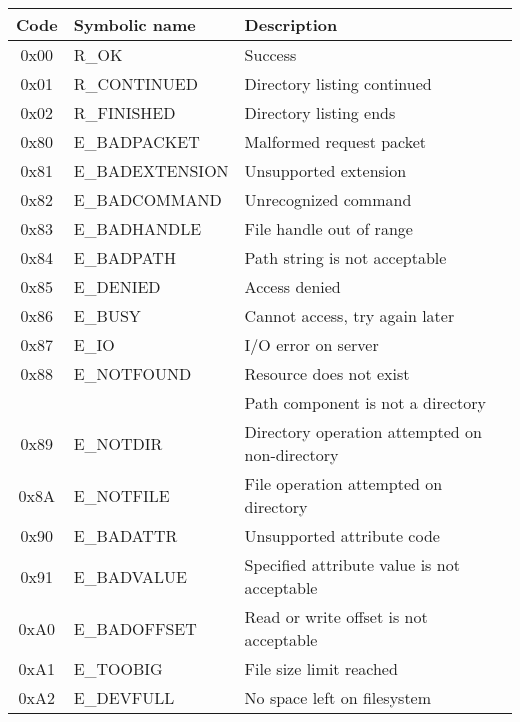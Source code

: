 
\begin{table}
\begin{center}

\def\tline#1#2{ {\ttfamily #1} & {\ttfamily #2} }
\begin{tabular}{cll}
	\hline
	Code & Symbolic name & Description \\
	\hline
	\tline{0x00}{R\_OK} & Success \\
	\tline{0x01}{R\_CONTINUED} & Directory listing continued \\
	\tline{0x02}{R\_FINISHED} & Directory listing ends \\
	\hline

	\tline{0x80}{E\_BADPACKET} & Malformed request packet \\
	\tline{0x81}{E\_BADEXTENSION} & Unsupported extension \\
	\tline{0x82}{E\_BADCOMMAND} & Unrecognized command \\
	\tline{0x83}{E\_BADHANDLE} & File handle out of range \\
	\tline{0x84}{E\_BADPATH} & Path string is not acceptable \\
	\tline{0x85}{E\_DENIED} & Access denied \\
	\tline{0x86}{E\_BUSY} & Cannot access, try again later \\
	\tline{0x87}{E\_IO} & I/O error on server \\
	\tline{0x88}{E\_NOTFOUND} & Resource does not exist \\
		~ & ~ & Path component is not a directory \\
	\tline{0x89}{E\_NOTDIR} & Directory operation attempted on non-directory \\
	\tline{0x8A}{E\_NOTFILE} & File operation attempted on directory \\
	
	\hline

	\tline{0x90}{E\_BADATTR} & Unsupported attribute code \\
	\tline{0x91}{E\_BADVALUE} & Specified attribute value is not acceptable \\

	\hline

	\tline{0xA0}{E\_BADOFFSET} & Read or write offset is not acceptable \\
	\tline{0xA1}{E\_TOOBIG} & File size limit reached \\
	\tline{0xA2}{E\_DEVFULL} & No space left on filesystem \\


\end{tabular}
\end{center}
\end{table}
